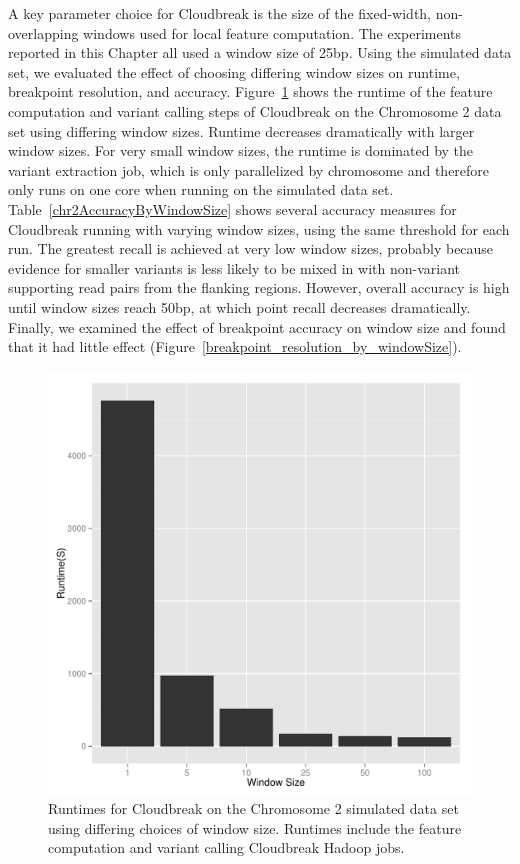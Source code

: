 A key parameter choice for Cloudbreak is the size of the fixed-width, non-overlapping windows used for local feature computation. The experiments reported in this Chapter all used a window size of 25bp. Using the simulated data set, we evaluated the effect of choosing differing window sizes on runtime, breakpoint resolution, and accuracy. Figure~\ref{figure_runtime_by_window_size} shows the runtime of the feature computation and variant calling steps of Cloudbreak on the Chromosome 2 data set using differing window sizes. Runtime decreases dramatically with larger window sizes. For very small window sizes, the runtime is dominated by the variant extraction job, which is only parallelized by chromosome and therefore only runs on one core when running on the simulated data set. Table~\ref{chr2AccuracyByWindowSize} shows several accuracy measures for Cloudbreak running with varying window sizes, using the same threshold for each run. The greatest recall is achieved at very low window sizes, probably because evidence for smaller variants is less likely to be mixed in with non-variant supporting read pairs from the flanking regions. However, overall accuracy is high until window sizes reach 50bp, at which point recall decreases dramatically. Finally, we examined the effect of breakpoint accuracy on window size and found that it had little effect (Figure~\ref{breakpoint_resolution_by_windowSize}).

\begin{figure}
\centering
\includegraphics[width=.8\textwidth]{figures/runtime_by_windowSize.pdf}
\caption{Runtimes for Cloudbreak on the Chromosome 2 simulated data set using differing choices of window size. Runtimes include the feature computation and variant calling Cloudbreak Hadoop jobs.}
\label{figure_runtime_by_window_size}
\end{figure}

